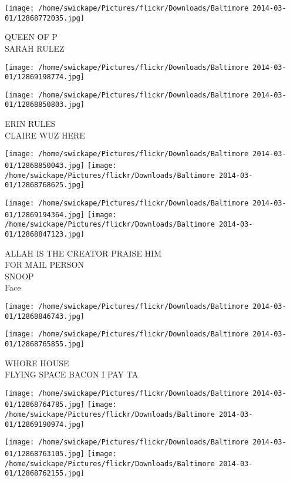 \documentclass[10pt,letterpaper]{article}
\begin{document}
\vspace{0.25in}
\texttt{[image: /home/swickape/Pictures/flickr/Downloads/Baltimore 2014-03-01/12868772035.jpg]}

QUEEN OF P\\
SARAH RULEZ
\pagebreak

\texttt{[image: /home/swickape/Pictures/flickr/Downloads/Baltimore 2014-03-01/12869198774.jpg]}

\vspace{0.25in}
\texttt{[image: /home/swickape/Pictures/flickr/Downloads/Baltimore 2014-03-01/12868850803.jpg]}

ERIN RULES\\
CLAIRE WUZ HERE
\pagebreak

\texttt{[image: /home/swickape/Pictures/flickr/Downloads/Baltimore 2014-03-01/12868850043.jpg]}
\texttt{[image: /home/swickape/Pictures/flickr/Downloads/Baltimore 2014-03-01/12868768625.jpg]}

\texttt{[image: /home/swickape/Pictures/flickr/Downloads/Baltimore 2014-03-01/12869194364.jpg]}
\texttt{[image: /home/swickape/Pictures/flickr/Downloads/Baltimore 2014-03-01/12868847123.jpg]}

ALLAH IS THE CREATOR PRAISE HIM\\
FOR MAIL PERSON\\
SNOOP\\
Face
\pagebreak

\texttt{[image: /home/swickape/Pictures/flickr/Downloads/Baltimore 2014-03-01/12868846743.jpg]}

\vspace{0.25in}
\texttt{[image: /home/swickape/Pictures/flickr/Downloads/Baltimore 2014-03-01/12868765855.jpg]}

WHORE HOUSE\\
FLYING SPACE BACON I PAY TA
\pagebreak

\texttt{[image: /home/swickape/Pictures/flickr/Downloads/Baltimore 2014-03-01/12868764785.jpg]}
\texttt{[image: /home/swickape/Pictures/flickr/Downloads/Baltimore 2014-03-01/12869190974.jpg]}

\texttt{[image: /home/swickape/Pictures/flickr/Downloads/Baltimore 2014-03-01/12868763105.jpg]}
\texttt{[image: /home/swickape/Pictures/flickr/Downloads/Baltimore 2014-03-01/12868762155.jpg]}
\end{document}
